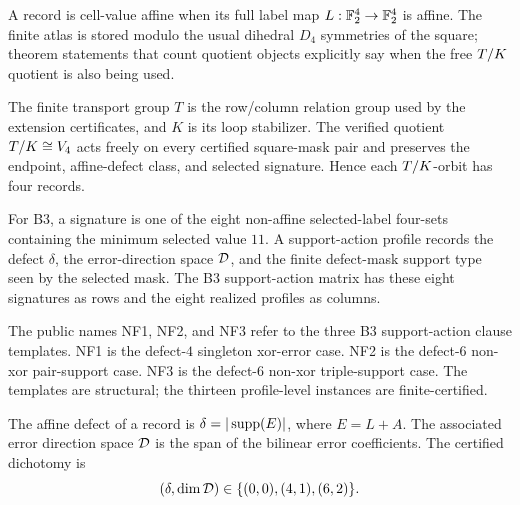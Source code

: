 \begin{definition}
A record is cell-value affine when its full label map \(L:\mathbb F_2^4\to\mathbb F_2^4\) is
affine.  The finite atlas is stored modulo the usual dihedral \(D_4\) symmetries
of the square; theorem statements that count quotient objects explicitly say
when the free \(T/K\) quotient is also being used.
\end{definition}

\begin{definition}
The finite transport group \(T\) is the row/column relation group used by the
extension certificates, and \(K\) is its loop stabilizer.  The verified quotient
\(T/K\cong V_4\) acts freely on every certified square-mask pair and preserves
the endpoint, affine-defect class, and selected signature.  Hence each
\(T/K\)-orbit has four records.
\end{definition}

\begin{definition}
For B3, a signature is one of the eight non-affine selected-label four-sets
containing the minimum selected value \(11\).  A support-action profile records
the defect \(\delta\), the error-direction space \(\mathcal D\), and the finite
defect-mask support type seen by the selected mask.  The B3 support-action
matrix has these eight signatures as rows and the eight realized profiles as
columns.
\end{definition}

\begin{definition}
The public names NF1, NF2, and NF3 refer to the three B3 support-action clause
templates.  NF1 is the defect-\(4\) singleton xor-error case.  NF2 is the
defect-\(6\) non-xor pair-support case.  NF3 is the defect-\(6\) non-xor
triple-support case.  The templates are structural; the thirteen profile-level
instances are finite-certified.
\end{definition}

\begin{definition}
The affine defect of a record is \(\delta=|\operatorname{supp}(E)|\), where \(E=L+A\).  The
associated error direction space \(\mathcal D\) is the span of the bilinear error
coefficients.  The certified dichotomy is
\[
  (\delta,\dim \mathcal D)\in\{(0,0),(4,1),(6,2)\}.
\]
\end{definition}


